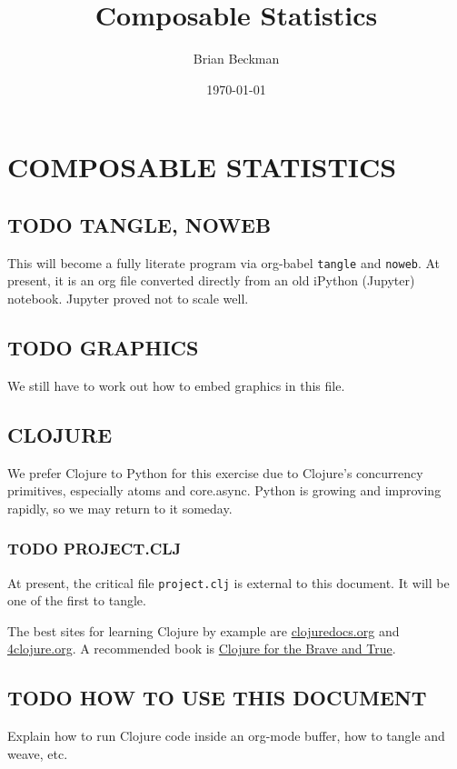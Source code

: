 \documentclass[10pt,oneside,x11names]{article}
\author{Brian Beckman}
\date{\today}
\title{Composable Statistics}
\begin{document}
\maketitle
\setcounter{tocdepth}{2}
\tableofcontents


\section{COMPOSABLE STATISTICS}
\label{composable-statistics}
\subsection{{\bfseries\sffamily TODO} TANGLE, NOWEB}
\label{sec:orgd4aab8a}

This will become a fully literate program via org-babel \texttt{tangle} and
\texttt{noweb}. At present, it is an org file converted directly from an old
iPython (Jupyter) notebook. Jupyter proved not to scale well.

\subsection{{\bfseries\sffamily TODO} GRAPHICS}
\label{sec:org44638ea}

We still
have to work out how to embed graphics in this file.

\subsection{CLOJURE}
\label{clojure}
We prefer Clojure to Python for this exercise due to Clojure's
concurrency primitives, especially atoms and core.async. Python is
growing and improving rapidly, so we may return to it someday.

\subsubsection{{\bfseries\sffamily TODO} PROJECT.CLJ}
\label{sec:orgcbc10fb}

At present, the critical file \texttt{project.clj} is external to this
document. It will be one of the first to tangle.

The best sites for learning Clojure by example are
\href{http://clojuredocs.org}{clojuredocs.org} and
\href{http://4clojure.org}{4clojure.org}. A recommended book is
\href{http://braveclojure.com}{Clojure for the Brave and True}.

\subsection{{\bfseries\sffamily TODO} HOW TO USE THIS DOCUMENT}
\label{how-to-use-this-document}
Explain how to run Clojure code inside an org-mode buffer, how to tangle and
weave, etc.
\end{document}
